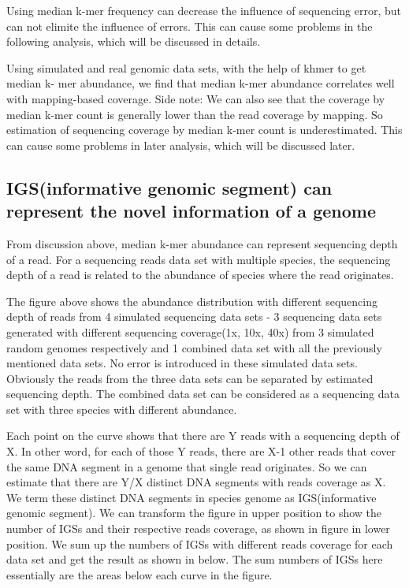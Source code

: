 \documentclass{article}
\begin{document}
Using median k-mer frequency can decrease the influence of sequencing error, but can not elimite the influence of errors. This can cause some problems in the following analysis, which will be discussed in details.


Using simulated and real genomic data sets, with the help of khmer to get median k- mer abundance, we find that median k-mer abundance correlates well with mapping-based coverage.
Side note: We can also see that the coverage by median k-mer count is generally lower than the read coverage by mapping. So estimation of sequencing coverage by median k-mer count is underestimated. This can cause some problems in later analysis, which will be discussed later.

\subsection{IGS(informative genomic segment) can represent the novel information of a genome}

From discussion above, median k-mer abundance can represent sequencing depth of a read. For a sequencing reads data set with multiple species, the sequencing depth of a read is related to the abundance of species where the read originates. 


The figure above shows the abundance distribution with different sequencing depth of reads from 4 simulated sequencing data sets - 3 sequencing data sets generated with different sequencing coverage(1x, 10x, 40x) from 3 simulated random genomes respectively and 1 combined data set with all the previously mentioned data sets. No error is introduced in these simulated data sets. Obviously the reads from the three data sets can be separated by estimated sequencing depth. The combined data set can be considered as a sequencing data set with three species with different abundance.

Each point on the curve shows that there are Y reads with a sequencing depth of X. In other word, for each of those Y reads, there are X-1 other reads that cover the same DNA segment in a genome that single read originates. So we can estimate that there are Y/X distinct DNA segments with reads coverage as X. We term these distinct DNA segments in species genome as IGS(informative genomic segment). We can transform the figure in upper position to show the number of IGSs and their respective reads coverage, as shown in figure in lower position. We sum up the numbers of IGSs with different reads coverage for each data set and get the result as shown in below. The sum numbers of IGSs here essentially are the areas below each curve in the figure.
\end{document}
